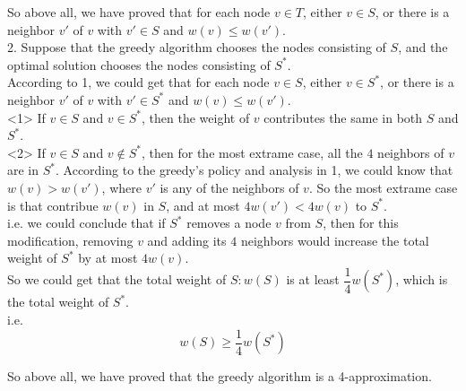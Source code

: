 So above all, we have proved that for each node $v \in T$, either $v \in S$, or there is a neighbor $v'$ of $v$ with $v' \in S$ and $w(v) \leq w(v')$.\\

2. Suppose that the greedy algorithm chooses the nodes consisting of $S$, and the optimal solution chooses the nodes consisting of $S^*$.\\

According to 1, we could get that for each node $v \in S$, either $v \in S^*$, or there is a neighbor $v'$ of $v$ with $v' \in S^*$ and $w(v) \leq w(v')$.\\

<1> If $v\in S$ and $v\in S^*$, then the weight of $v$ contributes the same in both $S$ and $S^*$.\\

<2> If $v\in S$ and $v\notin S^*$, then for the most extrame case, all the $4$ neighbors of $v$ are in $S^*$. According to the greedy's policy and analysis in 1, we could know that $w(v)>w(v')$, where $v'$ is any of the neighbors of $v$. So the most extrame case is that contribue $w(v)$ in $S$, and at most $4w(v')<4w(v)$ to $S^*$.\\

i.e. we could conclude that if $S^*$ removes a node $v$ from $S$, then for this modification, removing $v$ and adding its $4$ neighbors would increase the total weight of $S^*$ by at most $4w(v)$.\\

So we could get that the total weight of $S: w(S)$ is at least $\dfrac{1}{4}w(S^*)$, which is the total weight of $S^*$.\\
i.e.
$$w(S)\geq \dfrac{1}{4}w(S^*)$$

So above all, we have proved that the greedy algorithm is a 4-approximation.\\